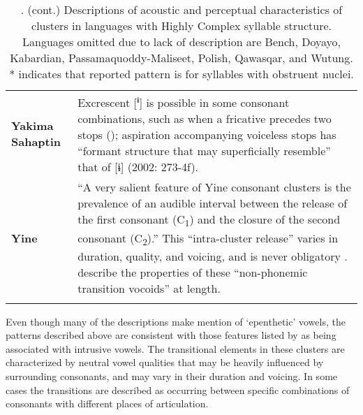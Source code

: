 \begin{table}
\begin{tabularx}{\textwidth}{XX}
\textbf{Yakima} \textbf{Sahaptin} & Excrescent [\textsuperscript{ɨ}] is possible in some consonant combinations, such as when a fricative precedes two stops (\citealt{HargusBeavert2002}); aspiration accompanying voiceless stops has “formant structure that may superficially resemble” that of [ɨ] (2002: 273-4f).\\
\textbf{Yine} & “A very salient feature of Yine consonant clusters is the prevalence of an audible interval between the release of the first consonant (C\textsubscript{1}) and the closure of the second consonant (C\textsubscript{2}).” This “intra-cluster release” varies in duration, quality, and voicing, and is never obligatory \citep[28-9]{Hanson2010}. \citet{MattesonPike1958} describe the properties of these “non-phonemic transition vocoids” at length.\\
\lspbottomrule
\end{tabularx}
\caption{\label{tab:key:3.17}. (cont.) Descriptions of acoustic and perceptual characteristics of clusters in languages with Highly Complex syllable structure. Languages omitted due to lack of description are Bench, Doyayo, Kabardian, Passamaquoddy-Maliseet, Polish, Qawasqar, and Wutung. * indicates that reported pattern is for syllables with obstruent nuclei.}
\end{table}




  Even though many of the descriptions make mention of ‘epenthetic’ vowels, the patterns described above are consistent with those features listed by \citet{Hall2006} as being associated with intrusive vowels. The transitional elements in these clusters are characterized by neutral vowel qualities that may be heavily influenced by surrounding consonants, and may vary in their duration and voicing. In some cases the transitions are described as occurring between specific combinations of consonants with different places of articulation.



